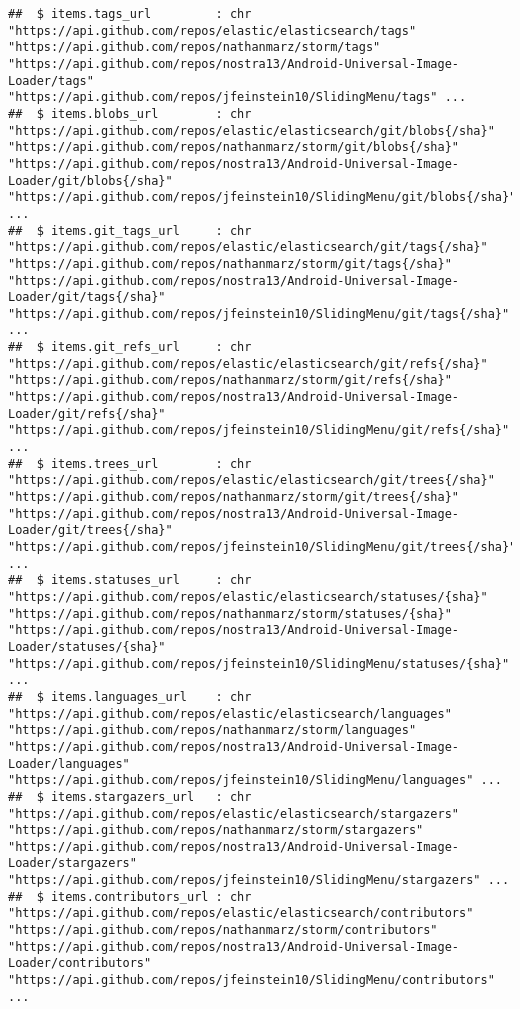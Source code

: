 \documentclass{article}\usepackage[]{graphicx}\usepackage[]{color}
\makeatletter
\newenvironment{kframe}{%
 \def\at@end@of@kframe{}%
 \ifinner\ifhmode%
  \def\at@end@of@kframe{\end{minipage}}%
  \begin{minipage}{\columnwidth}%
 \fi\fi%
 \def\FrameCommand##1{\hskip\@totalleftmargin \hskip-\fboxsep
 \colorbox{shadecolor}{##1}\hskip-\fboxsep
     \hskip-\linewidth \hskip-\@totalleftmargin \hskip\columnwidth}%
 \MakeFramed {\advance\hsize-\width
   \@totalleftmargin\z@ \linewidth\hsize
   \@setminipage}}%
 {\par\unskip\endMakeFramed%
 \at@end@of@kframe}
\newenvironment{knitrout}{}{} %
\makeatother
\begin{document}
\begin{knitrout}
\begin{kframe}
\begin{verbatim}
##  $ items.tags_url         : chr  "https://api.github.com/repos/elastic/elasticsearch/tags" "https://api.github.com/repos/nathanmarz/storm/tags" "https://api.github.com/repos/nostra13/Android-Universal-Image-Loader/tags" "https://api.github.com/repos/jfeinstein10/SlidingMenu/tags" ...
##  $ items.blobs_url        : chr  "https://api.github.com/repos/elastic/elasticsearch/git/blobs{/sha}" "https://api.github.com/repos/nathanmarz/storm/git/blobs{/sha}" "https://api.github.com/repos/nostra13/Android-Universal-Image-Loader/git/blobs{/sha}" "https://api.github.com/repos/jfeinstein10/SlidingMenu/git/blobs{/sha}" ...
##  $ items.git_tags_url     : chr  "https://api.github.com/repos/elastic/elasticsearch/git/tags{/sha}" "https://api.github.com/repos/nathanmarz/storm/git/tags{/sha}" "https://api.github.com/repos/nostra13/Android-Universal-Image-Loader/git/tags{/sha}" "https://api.github.com/repos/jfeinstein10/SlidingMenu/git/tags{/sha}" ...
##  $ items.git_refs_url     : chr  "https://api.github.com/repos/elastic/elasticsearch/git/refs{/sha}" "https://api.github.com/repos/nathanmarz/storm/git/refs{/sha}" "https://api.github.com/repos/nostra13/Android-Universal-Image-Loader/git/refs{/sha}" "https://api.github.com/repos/jfeinstein10/SlidingMenu/git/refs{/sha}" ...
##  $ items.trees_url        : chr  "https://api.github.com/repos/elastic/elasticsearch/git/trees{/sha}" "https://api.github.com/repos/nathanmarz/storm/git/trees{/sha}" "https://api.github.com/repos/nostra13/Android-Universal-Image-Loader/git/trees{/sha}" "https://api.github.com/repos/jfeinstein10/SlidingMenu/git/trees{/sha}" ...
##  $ items.statuses_url     : chr  "https://api.github.com/repos/elastic/elasticsearch/statuses/{sha}" "https://api.github.com/repos/nathanmarz/storm/statuses/{sha}" "https://api.github.com/repos/nostra13/Android-Universal-Image-Loader/statuses/{sha}" "https://api.github.com/repos/jfeinstein10/SlidingMenu/statuses/{sha}" ...
##  $ items.languages_url    : chr  "https://api.github.com/repos/elastic/elasticsearch/languages" "https://api.github.com/repos/nathanmarz/storm/languages" "https://api.github.com/repos/nostra13/Android-Universal-Image-Loader/languages" "https://api.github.com/repos/jfeinstein10/SlidingMenu/languages" ...
##  $ items.stargazers_url   : chr  "https://api.github.com/repos/elastic/elasticsearch/stargazers" "https://api.github.com/repos/nathanmarz/storm/stargazers" "https://api.github.com/repos/nostra13/Android-Universal-Image-Loader/stargazers" "https://api.github.com/repos/jfeinstein10/SlidingMenu/stargazers" ...
##  $ items.contributors_url : chr  "https://api.github.com/repos/elastic/elasticsearch/contributors" "https://api.github.com/repos/nathanmarz/storm/contributors" "https://api.github.com/repos/nostra13/Android-Universal-Image-Loader/contributors" "https://api.github.com/repos/jfeinstein10/SlidingMenu/contributors" ...

\end{verbatim}
\end{kframe}
\end{knitrout}
\end{document}
